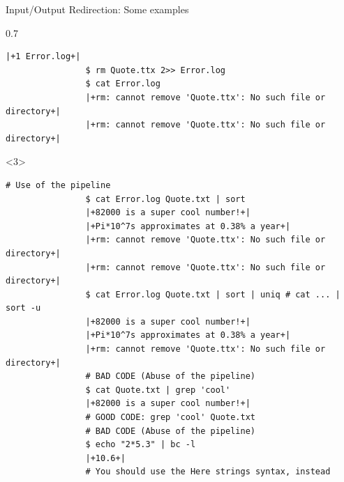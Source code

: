\begin{frame}[fragile]{Input/Output Redirection: Some examples}
\begin{overlayarea}{\textwidth}{0.7\textheight}
\begin{onlyenv}
\begin{lstlisting}[style=MyBash, aboveskip=2mm, firstnumber=19]
                |+1 Error.log+|
                $ rm Quote.ttx 2>> Error.log
                $ cat Error.log
                |+rm: cannot remove 'Quote.ttx': No such file or directory+|
                |+rm: cannot remove 'Quote.ttx': No such file or directory+|
            \end{lstlisting}
        \end{onlyenv}
        \begin{onlyenv}<3>
            \begin{lstlisting}[style=MyBash, aboveskip=2mm, firstnumber=37]
                # Use of the pipeline
                $ cat Error.log Quote.txt | sort
                |+82000 is a super cool number!+|
                |+Pi*10^7s approximates at 0.38% a year+|
                |+rm: cannot remove 'Quote.ttx': No such file or directory+|
                |+rm: cannot remove 'Quote.ttx': No such file or directory+|
                $ cat Error.log Quote.txt | sort | uniq # cat ... | sort -u
                |+82000 is a super cool number!+|
                |+Pi*10^7s approximates at 0.38% a year+|
                |+rm: cannot remove 'Quote.ttx': No such file or directory+|
                # BAD CODE (Abuse of the pipeline)
                $ cat Quote.txt | grep 'cool'
                |+82000 is a super cool number!+|
                # GOOD CODE: grep 'cool' Quote.txt
                # BAD CODE (Abuse of the pipeline)
                $ echo "2*5.3" | bc -l
                |+10.6+|
                # You should use the Here strings syntax, instead
            \end{lstlisting}
        \end{onlyenv}
    \end{overlayarea}
\end{frame}
